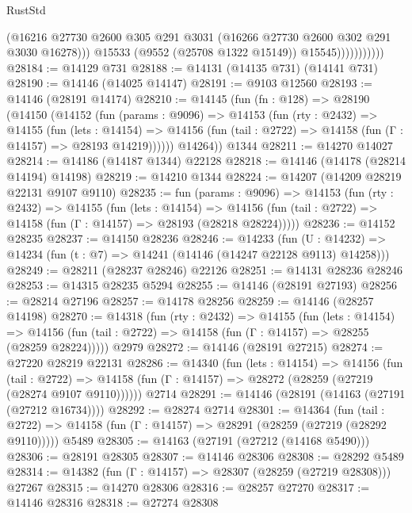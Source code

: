 \begin{lexlean}{RustStd}
\begin{coremodule}
                            (@16216
                              @27730
                              @2600
                              @305
                              @291
                              @3031
                              (@16266 @27730 @2600 @302 @291 @3030 @16278)))
                          @15533
                          (@9552 (@25708 @1322 @15149))
                          @15545)))))))))))
@28184 := @14129 @731
@28188 := @14131 (@14135 @731) (@14141 @731)
@28190 := @14146 (@14025 @14147)
@28191 := @9103 @12560
@28193 := @14146 (@28191 @14174)
@28210 := @14145
    (fun (fn : @128) =>
    @28190
      (@14150
        (@14152
          (fun (params : @9096) =>
          @14153
            (fun (rty : @2432) =>
            @14155
              (fun (lets : @14154) =>
              @14156 (fun (tail : @2722) => @14158 (fun (Γ : @14157) => @28193 @14219))))))
        @14264))
    @1344
@28211 := @14270 @14027
@28214 := @14186 (@14187 @1344) @22128
@28218 := @14146 (@14178 (@28214 @14194) @14198)
@28219 := @14210 @1344
@28224 := @14207 (@14209 @28219 @22131 @9107 @9110)
@28235 := fun (params : @9096) =>
  @14153
    (fun (rty : @2432) =>
    @14155
      (fun (lets : @14154) =>
      @14156 (fun (tail : @2722) => @14158 (fun (Γ : @14157) => @28193 (@28218 @28224)))))
@28236 := @14152 @28235
@28237 := @14150 @28236
@28246 := @14233
    (fun (U : @14232) => @14234 (fun (t : @7) => @14241 (@14146 (@14247 @22128 @9113) @14258)))
@28249 := @28211 (@28237 @28246) @22126
@28251 := @14131 @28236 @28246
@28253 := @14315 @28235 @5294
@28255 := @14146 (@28191 @27193)
@28256 := @28214 @27196
@28257 := @14178 @28256
@28259 := @14146 (@28257 @14198)
@28270 := @14318
    (fun (rty : @2432) =>
    @14155
      (fun (lets : @14154) =>
      @14156 (fun (tail : @2722) => @14158 (fun (Γ : @14157) => @28255 (@28259 @28224)))))
    @2979
@28272 := @14146 (@28191 @27215)
@28274 := @27220 @28219 @22131
@28286 := @14340
    (fun (lets : @14154) =>
    @14156
      (fun (tail : @2722) =>
      @14158 (fun (Γ : @14157) => @28272 (@28259 (@27219 (@28274 @9107 @9110))))))
    @2714
@28291 := @14146 (@28191 (@14163 (@27191 (@27212 @16734))))
@28292 := @28274 @2714
@28301 := @14364
    (fun (tail : @2722) => @14158 (fun (Γ : @14157) => @28291 (@28259 (@27219 (@28292 @9110)))))
    @5489
@28305 := @14163 (@27191 (@27212 (@14168 @5490)))
@28306 := @28191 @28305
@28307 := @14146 @28306
@28308 := @28292 @5489
@28314 := @14382 (fun (Γ : @14157) => @28307 (@28259 (@27219 @28308))) @27267
@28315 := @14270 @28306
@28316 := @28257 @27270
@28317 := @14146 @28316
@28318 := @27274 @28308

\end{coremodule}
\end{lexlean}
